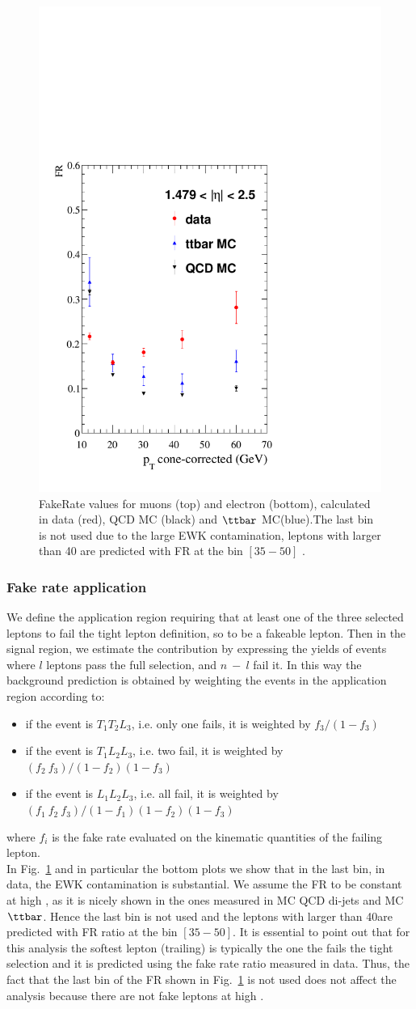\begin{figure}[h!]
\includegraphics[width=.23\textwidth]{Figures/c5/FAKE/ele3.pdf}
\caption{FakeRate values for muons (top) and electron (bottom), calculated in data (red), QCD MC (black) and $\ttbar$ MC(blue).The last bin is not used due to the large EWK contamination, leptons with \pt larger than 40 \GeV are predicted with FR at the bin $[35-50]$ \GeV.}
\label{fig:comparison_muon}
\end{figure}

\vspace {5cm}
\subsubsection{Fake rate application}
We define the application region requiring that at least one of the three selected leptons to fail the tight lepton definition, so to be a fakeable lepton. Then in the signal region, we estimate the contribution by expressing the yields of events where $l$ leptons pass the full selection, and $n \ - \ l$ fail it. In this way the background prediction is obtained by weighting the events in the application region according to:
\begin{itemize}
\setlength\itemsep{-0.2em}
\item if the event is $T_{1}T_{2}L_{3}$, i.e. only one fails, it is weighted by $f_{3}/(1-f_{3})$
\item if the event is $T_{1}L_{2}L_{3}$, i.e. two fail, it is weighted by $(f_{2} \ f_{3})/(1-f_{2})(1-f_{3})$
\item if the event is $L_{1}L_{2}L_{3}$, i.e. all fail, it is weighted by $(f_{1} \ f_{2} \ f_{3})/(1-f_{1})(1-f_{2})(1-f_{3})$
\end{itemize}
where $f_{i}$ is the fake rate evaluated on the kinematic quantities
of the failing lepton.\\
In Fig.~\ref{fig:comparison_muon} and in particular the bottom plots we show that in the last bin, in data, the EWK contamination is substantial. We assume the FR to be constant at high \pt, as it is nicely shown in the ones measured in MC QCD di-jets and MC $\ttbar$. Hence the last bin is not used and the leptons with \pt larger than 40\GeV are predicted with FR ratio at the bin $[35-50]$\GeV.
It is essential to point out that for this analysis the softest lepton (trailing) is typically the one the fails the tight selection and it is predicted using the fake rate ratio measured in data. Thus, the fact that the last bin of the FR shown in Fig.~\ref{fig:comparison_muon} is not used does not affect the analysis because there are not fake leptons at high \pt. 


